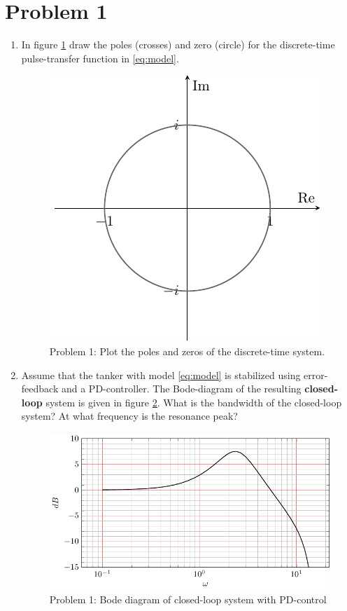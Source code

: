 \documentclass[a4paper]{scrartcl}
\begin{document}
\section*{Problem 1}
\label{sec-1}
\begin{enumerate}
\item In figure \ref{fig:complex-plane} draw the poles (crosses) and zero (circle) for the  discrete-time pulse-transfer function in \eqref{eq:model}.
\begin{figure}[h]
\begin{center}
\includegraphics[]{complex-plane}
\caption{Problem 1: Plot the poles and zeros of the discrete-time system.}
\label{fig:complex-plane}
\end{center}
\end{figure}
\item Assume that the tanker with model \eqref{eq:model} is stabilized using error-feedback and a PD-controller. The  Bode-diagram of the resulting \textbf{closed-loop} system is  given in figure \ref{fig:bode}. What is the bandwidth of the closed-loop system? At what frequency is the resonance peak? 
\begin{figure}[h]
\begin{center}
\includegraphics[]{bode-closed}
\caption{Problem 1: Bode diagram of closed-loop system with PD-control}
\label{fig:bode}
\end{center}
\end{figure}
\end{enumerate}
\end{document}
